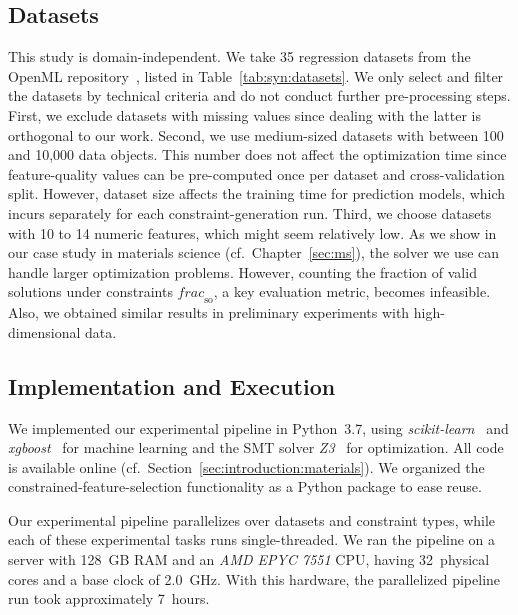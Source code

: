 \subsection{Datasets}
\label{sec:syn:experimental-design:datasets}

This study is domain-independent.
We take 35 regression datasets from the OpenML repository~\cite{vanschoren2014openml}, listed in Table~\ref{tab:syn:datasets}.
We only select and filter the datasets by technical criteria and do not conduct further pre-processing steps.
First, we exclude datasets with missing values since dealing with the latter is orthogonal to our work.
Second, we use medium-sized datasets with between 100 and 10,000 data objects.
This number does not affect the optimization time since feature-quality values can be pre-computed once per dataset and cross-validation split.
However, dataset size affects the training time for prediction models, which incurs separately for each constraint-generation run.
Third, we choose datasets with 10 to 14 numeric features, which might seem relatively low.
As we show in our case study in materials science (cf.~Chapter~\ref{sec:ms}), the solver we use can handle larger optimization problems.
However, counting the fraction of valid solutions under constraints $\mathit{frac}_{\text{so}}$, a key evaluation metric, becomes infeasible.
Also, we obtained similar results in preliminary experiments with high-dimensional data.

\subsection{Implementation and Execution}
\label{sec:syn:experimental-design:implementation}

We implemented our experimental pipeline in Python~3.7, using \emph{scikit-learn}~\cite{pedregosa2011scikit-learn} and \emph{xgboost}~\cite{chen2016xgboost} for machine learning and the SMT solver \emph{Z3}~\cite{bjorner2015nuz, deMoura2008z3} for optimization.
All code is available online (cf.~Section~\ref{sec:introduction:materials}).
We organized the constrained-feature-selection functionality as a Python package to ease reuse.

Our experimental pipeline parallelizes over datasets and constraint types, while each of these experimental tasks runs single-threaded.
We ran the pipeline on a server with 128~GB RAM and an \emph{AMD EPYC 7551} CPU, having 32~physical cores and a base clock of 2.0~GHz.
With this hardware, the parallelized pipeline run took approximately 7~hours.

